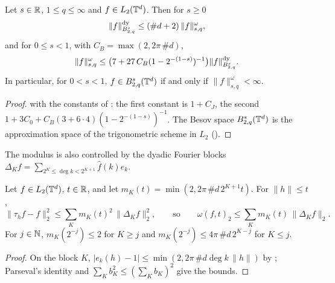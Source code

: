 \begin{theorem}
\label{thm:moduli-coincidence}
\leanok
{}
Let $s \in \mathbb{R}$, $1 \leq q \leq \infty$ and $f \in L_2(\mathbb{T}^d)$. Then for $s \geq 0$
\[
  \|f\|^{\mathrm{dy}}_{B^{s}_{2,q}} \leq (\#d + 2) \, \|f\|^{\omega}_{s,q} ,
\]
and for $0 \leq s < 1$, with $C_B = \max(2, 2\pi \, \#d)$,
\[
  \|f\|^{\omega}_{s,q} \leq \bigl(7 + 27 \, C_B (1 - 2^{-(1-s)})^{-1}\bigr)
  \|f\|^{\mathrm{dy}}_{B^{s}_{2,q}} .
\]
In particular, for $0 < s < 1$, $f \in B^{s}_{2,q}(\mathbb{T}^d)$ if and only if
$\|f\|^{\omega}_{s,q} < \infty$.
\end{theorem}

\begin{proof}
\leanok
{}
 with the constants of : the first
constant is $1 + C_J$, the second $1 + 3 C_0 + C_B (3 + 6 \cdot 4)(1 - 2^{-(1-s)})^{-1}$. The
Besov space $B^{s}_{2,q}(\mathbb{T}^d)$ is the approximation space of the trigonometric scheme in
$L_2$ ().
\end{proof}

The modulus is also controlled by the dyadic Fourier blocks
$\Delta_K f = \sum_{2^K \leq \deg k < 2^{K+1}} \hat f(k) e_k$.

\begin{lemma}
\label{lem:torus-modulus-blocks}
\leanok
{}
Let $f \in L_2(\mathbb{T}^d)$, $t \in \mathbb{R}$, and let $m_K(t) = \min(2, 2\pi \, \#d \, 2^{K+1} t)$. For
$\|h\| \leq t$,
\[
  \|\tau_h f - f\|_2^2 \leq \sum_K m_K(t)^2 \, \|\Delta_K f\|_2^2 ,
  \qquad\text{so}\qquad
  \omega(f, t)_2 \leq \sum_K m_K(t) \, \|\Delta_K f\|_2 .
\]
For $j \in \mathbb{N}$, $m_K(2^{-j}) \leq 2$ for $K \geq j$ and $m_K(2^{-j}) \leq 4\pi \, \#d \,
2^{K - j}$ for $K \leq j$.
\end{lemma}

\begin{proof}
\leanok
On the block $K$, $|e_k(h) - 1| \leq \min(2, 2\pi \, \#d \deg k \, \|h\|)$ by
; Parseval's identity and $\sum_K b_K^2 \leq (\sum_K b_K)^2$
give the bounds.
\end{proof}

